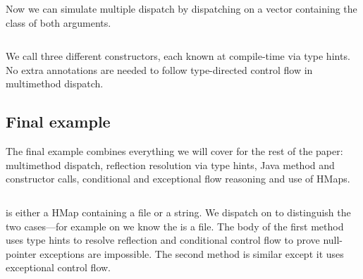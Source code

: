 Now we can simulate multiple dispatch by dispatching on
a vector containing the class of both arguments.

\begin{exmp}
\inputminted[firstline=6,lastline=22]{clojure}{code/demo/src/demo/eg7.clj}
\end{exmp}

We call three different  constructors, each known at compile-time
via type hints.
No extra annotations are needed to follow type-directed control flow
in multimethod dispatch.

\subsection{Final example}

The final example combines everything we will cover for the rest of the paper:
multimethod dispatch, reflection resolution via type hints, Java method
and constructor calls, conditional and exceptional flow reasoning
and use of HMaps. 

\begin{exmp}
\inputminted[firstline=6,lastline=20]{clojure}{code/demo/src/demo/eg8.clj}
\end{exmp}

 is either a HMap containing a file
or a string. We dispatch on  to distinguish the two cases---for example on 
we know the  is a file.
The body of the first method uses type hints to resolve reflection
and conditional control flow to prove null-pointer exceptions are impossible.
The second method is similar except it uses exceptional control flow.









